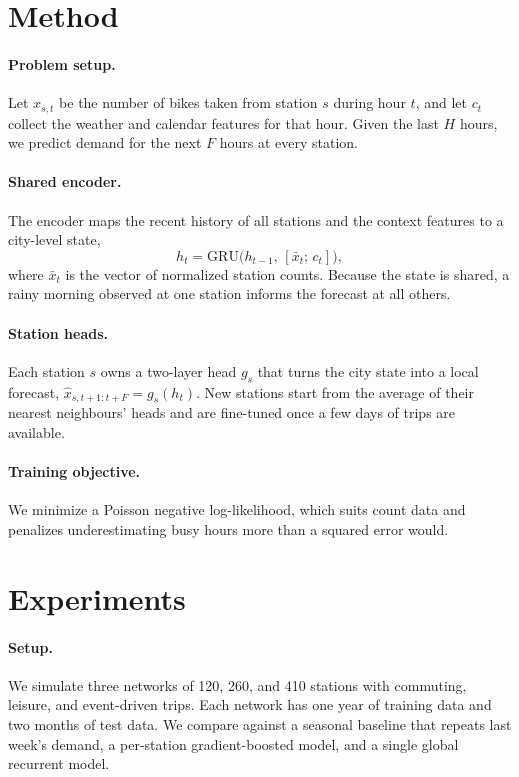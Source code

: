 \documentclass[10pt,twocolumn,letterpaper]{article}
\begin{document}
\section{Method}

\paragraph{Problem setup.}
Let $x_{s,t}$ be the number of bikes taken from station $s$ during hour $t$, and let $c_t$ collect the weather and calendar features for that hour.
Given the last $H$ hours, we predict demand for the next $F$ hours at every station.

\paragraph{Shared encoder.}
The encoder maps the recent history of all stations and the context features to a city-level state,
\begin{equation}
  h_t = \mathrm{GRU}\big(h_{t-1},\, [\bar{x}_{t};\, c_t]\big),
  \label{eq:encoder}
\end{equation}
where $\bar{x}_t$ is the vector of normalized station counts.
Because the state is shared, a rainy morning observed at one station informs the forecast at all others.

\paragraph{Station heads.}
Each station $s$ owns a two-layer head $g_s$ that turns the city state into a local forecast, $\hat{x}_{s,t+1:t+F} = g_s(h_t)$.
New stations start from the average of their nearest neighbours' heads and are fine-tuned once a few days of trips are available.

\paragraph{Training objective.}
We minimize a Poisson negative log-likelihood, which suits count data and penalizes underestimating busy hours more than a squared error would.

\section{Experiments}

\paragraph{Setup.}
We simulate three networks of 120, 260, and 410 stations with commuting, leisure, and event-driven trips.
Each network has one year of training data and two months of test data.
We compare against a seasonal baseline that repeats last week's demand, a per-station gradient-boosted model, and a single global recurrent model.
\end{document}
